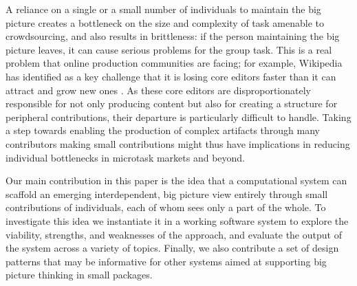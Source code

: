 A reliance on a single or a small number of individuals to maintain the big picture creates a bottleneck on the size and complexity of task amenable to crowdsourcing, and also results in brittleness: if the person maintaining the big picture leaves, it can cause serious problems for the group task. This is a real problem that online production communities are facing; for example, Wikipedia has identified as a key challenge that it is losing core editors faster than it can attract and grow new ones \cite{suh2009singularity}. As these core editors are disproportionately responsible for not only producing content but also for creating a structure for peripheral contributions, their departure is particularly difficult to handle. Taking a step towards enabling the production of complex artifacts through many contributors making small contributions might thus have implications in reducing individual bottlenecks in microtask markets and beyond.
 

Our main contribution in this paper is the idea that a computational system can scaffold an emerging interdependent, big picture view entirely through small contributions of individuals, each of whom sees only a part of the whole. To investigate this idea we instantiate it in a working software system to explore the viability, strengths, and weaknesses of the approach, and evaluate the output of the system across a variety of topics. Finally, we also contribute a set of design patterns that may be informative for other systems aimed at supporting big picture thinking in small packages.

